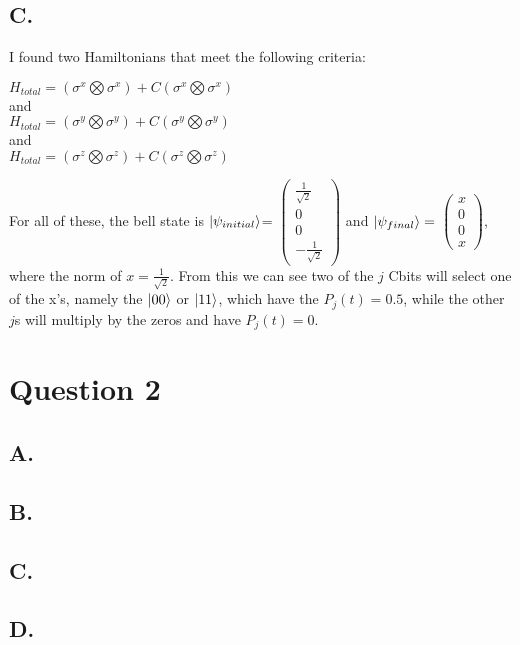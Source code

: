 \documentclass[12pt]{article}
\begin{document}
\subsection*{C.}
I found two Hamiltonians that meet the following criteria:
\begin{center}
    $H_{total} = (\sigma^x \bigotimes \sigma^x) + C (\sigma^x \bigotimes \sigma^x)$\\
    and\\
    $H_{total} = (\sigma^y \bigotimes \sigma^y) + C (\sigma^y \bigotimes \sigma^y)$\\
    and\\
    $H_{total} = (\sigma^z \bigotimes \sigma^z) + C (\sigma^z \bigotimes \sigma^z)$
\end{center}
For all of these, the bell state is $\ket{\psi_{initial}}$=
$
\begin{pmatrix} 
    \frac{1}{\sqrt{2}} \\ 0 \\ 0 \\ -\frac{1}{\sqrt{2}}
\end{pmatrix}
$
and $\ket{\psi_{final}}=$
$
\begin{pmatrix} 
    x \\ 0 \\ 0 \\ x
\end{pmatrix}
$, where the norm of $x=\frac{1}{\sqrt{2}}$.
From this we can see two of the $j$ Cbits will select one of the x's, namely the $\ket{00}$ or $\ket{11}$, which have the $P_j(t)=0.5$, while the other $j$s will multiply by the zeros and have $P_j(t)=0$.

\section*{Question 2}
\subsection*{A.}
 
\subsection*{B.}
\subsection*{C.}
\subsection*{D.}
\end{document}
